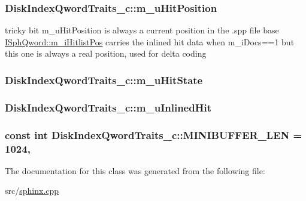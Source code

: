 \hypertarget{classDiskIndexQwordTraits__c_a13ed7b9b1bea7c85a8f20e71a017f63a}{
\subsubsection[{m\-\_\-u\-Hit\-Position}]{ Disk\-Index\-Qword\-Traits\-\_\-c\-::m\-\_\-u\-Hit\-Position}}\label{classDiskIndexQwordTraits__c_a13ed7b9b1bea7c85a8f20e71a017f63a}
tricky bit m\-\_\-u\-Hit\-Position is always a current position in the .spp file base \hyperlink{classISphQword_a3ae1cb3dd2ce423e64f5e731a0362e83}{I\-Sph\-Qword\-::m\-\_\-i\-Hitlist\-Pos} carries the inlined hit data when m\-\_\-i\-Docs==1 but this one is always a real position, used for delta coding \hypertarget{classDiskIndexQwordTraits__c_ad9d809a5bca5eeca6503d9d58e6ef61e}{
\subsubsection[{m\-\_\-u\-Hit\-State}]{ Disk\-Index\-Qword\-Traits\-\_\-c\-::m\-\_\-u\-Hit\-State}}\label{classDiskIndexQwordTraits__c_ad9d809a5bca5eeca6503d9d58e6ef61e}
\hypertarget{classDiskIndexQwordTraits__c_a1105d189e2bbe1465943ef11a81ab154}{
\subsubsection[{m\-\_\-u\-Inlined\-Hit}]{ Disk\-Index\-Qword\-Traits\-\_\-c\-::m\-\_\-u\-Inlined\-Hit}}\label{classDiskIndexQwordTraits__c_a1105d189e2bbe1465943ef11a81ab154}
\hypertarget{classDiskIndexQwordTraits__c_aa83fb688cb8688383baf8ccaa2de2e06}{
\subsubsection[{M\-I\-N\-I\-B\-U\-F\-F\-E\-R\-\_\-\-L\-E\-N}]{\setlength{\rightskip}{0pt plus 5cm}const {\bf int} Disk\-Index\-Qword\-Traits\-\_\-c\-::\-M\-I\-N\-I\-B\-U\-F\-F\-E\-R\-\_\-\-L\-E\-N = 1024\hspace{0.3cm}{\ttfamily [static]}, {\ttfamily [private]}}}\label{classDiskIndexQwordTraits__c_aa83fb688cb8688383baf8ccaa2de2e06}


The documentation for this class was generated from the following file\-:\begin{DoxyCompactItemize}
\item 
src/\hyperlink{sphinx_8cpp}{sphinx.\-cpp}\end{DoxyCompactItemize}

